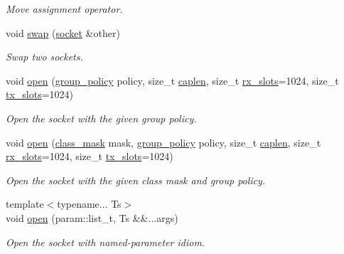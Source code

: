 \begin{DoxyCompactItemize}
\begin{DoxyCompactList}\small\item\em Move assignment operator. \end{DoxyCompactList}\item 
void \hyperlink{classpfq_1_1socket_ac80ebddf3a94f7964c74bf02954704ce}{swap} (\hyperlink{classpfq_1_1socket}{socket} \&other)
\begin{DoxyCompactList}\small\item\em Swap two sockets. \end{DoxyCompactList}\item 
void \hyperlink{classpfq_1_1socket_a432ea40ac382d251b105e3d5987b9b4a}{open} (\hyperlink{namespacepfq_ac41249c8510558905b01fa4d866a38d7}{group\+\_\+policy} policy, size\+\_\+t \hyperlink{classpfq_1_1socket_ab68dbba5ef01041b9c96758c4a9f0a6c}{caplen}, size\+\_\+t \hyperlink{classpfq_1_1socket_a5cf700fc12d67b91df3d669ac4aa737a}{rx\+\_\+slots}=1024, size\+\_\+t \hyperlink{classpfq_1_1socket_a019d15a072c043d6a1333ca0c836da4c}{tx\+\_\+slots}=1024)
\begin{DoxyCompactList}\small\item\em Open the socket with the given group policy. \end{DoxyCompactList}\item 
void \hyperlink{classpfq_1_1socket_ab86880ccdfdd9f875e376c6c8d22a2bb}{open} (\hyperlink{namespacepfq_a96af1f5ed530eff563eb917516758fbb}{class\+\_\+mask} mask, \hyperlink{namespacepfq_ac41249c8510558905b01fa4d866a38d7}{group\+\_\+policy} policy, size\+\_\+t \hyperlink{classpfq_1_1socket_ab68dbba5ef01041b9c96758c4a9f0a6c}{caplen}, size\+\_\+t \hyperlink{classpfq_1_1socket_a5cf700fc12d67b91df3d669ac4aa737a}{rx\+\_\+slots}=1024, size\+\_\+t \hyperlink{classpfq_1_1socket_a019d15a072c043d6a1333ca0c836da4c}{tx\+\_\+slots}=1024)
\begin{DoxyCompactList}\small\item\em Open the socket with the given class mask and group policy. \end{DoxyCompactList}\item 
{\footnotesize template$<$typename... Ts$>$ }\\void \hyperlink{classpfq_1_1socket_a33c3e305c62f5a9f8a0ef74f69097ecf}{open} (param\+::list\+\_\+t, Ts \&\&...args)
\begin{DoxyCompactList}\small\item\em Open the socket with named-\/parameter idiom. \end{DoxyCompactList}\item 

\end{DoxyCompactItemize}
